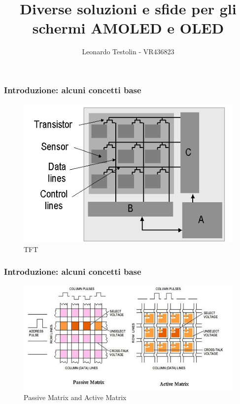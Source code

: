 \documentclass[12pt]{beamer}
\begin{document}
	\author{Leonardo Testolin - VR436823}
	\title{Diverse soluzioni e sfide per gli schermi
		AMOLED e OLED}
	\begin{frame}[plain]
		\maketitle
	\end{frame}
	
	\begin{frame}
		\frametitle{Introduzione: alcuni concetti base}
		\begin{figure}[h]
			\centering
			\includegraphics[width=1\textwidth]{IMMAGINI/arraydiag}
			\caption{TFT}
			\label{TFT}
		\end{figure}
	\end{frame}
	\begin{frame}
		\frametitle{Introduzione: alcuni concetti base}
		\begin{figure}
			\centering
			\includegraphics[width=1\linewidth]{IMMAGINI/matrix_passive}
			\caption{ Passive Matrix and Active Matrix}
			\label{fig:matrixpassive}
		\end{figure}
	\end{frame}
\end{document}
